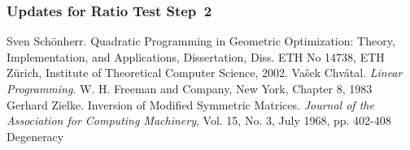 \documentclass[a4paper]{article}
\begin{document}
\subsubsection{Updates for Ratio Test Step~2}


\begin{thebibliography}{99}
 Sven Sch\"{o}nherr. Quadratic Programming in Geometric Optimization:
Theory, Implementation, and Applications, Dissertation, Diss. ETH No 14738, ETH
Z\"{u}rich, Institute of Theoretical Computer Science, 2002.
 Va\v{s}ek Chv\'{a}tal. \textit{Linear Programming}. W. H. Freeman and Company,
New York, Chapter 8, 1983 
 Gerhard Zielke. Inversion of Modified Symmetric Matrices. 
\textit{Journal of the Association for Computing Machinery}, Vol. 15, No. 3,
July 1968, pp. 402-408
 Degeneracy
\end{thebibliography}
\end{document}
